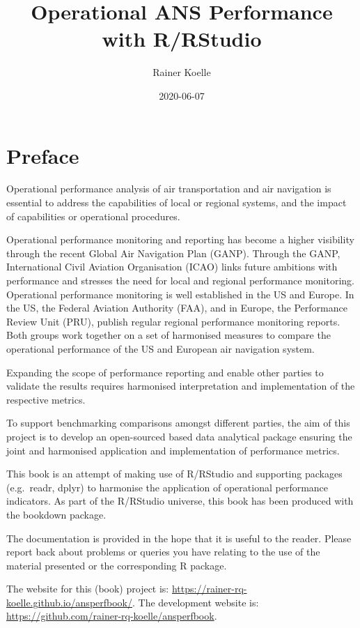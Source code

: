 \documentclass[
]{book}
\title{Operational ANS Performance with R/RStudio}
\author{Rainer Koelle}
\date{2020-06-07}
\begin{document}
\maketitle

{
\setcounter{tocdepth}{1}
\tableofcontents
}
\hypertarget{preface}{%
\chapter*{Preface}\label{preface}}

Operational performance analysis of air transportation and air navigation is essential to address the capabilities of local or regional systems, and the impact of capabilities or operational procedures.

Operational performance monitoring and reporting has become a higher visibility through the recent Global Air Navigation Plan (GANP). Through the GANP, International Civil Aviation Organisation (ICAO) links future ambitions with performance and stresses the need for local and regional performance monitoring.
Operational performance monitoring is well established in the US and Europe.
In the US, the Federal Aviation Authority (FAA), and in Europe, the Performance Review Unit (PRU), publish regular regional performance monitoring reports.
Both groups work together on a set of harmonised measures to compare the operational performance of the US and European air navigation system.

Expanding the scope of performance reporting and enable other parties to validate the results requires harmonised interpretation and implementation of the respective metrics.

To support benchmarking comparisons amongst different parties, the aim of this project is to develop an open-sourced based data analytical package ensuring the joint and harmonised application and implementation of performance metrics.

This book is an attempt of making use of R/RStudio and supporting packages (e.g.~readr, dplyr) to harmonise the application of operational performance indicators.
As part of the R/RStudio universe, this book has been produced with the bookdown package.

The documentation is provided in the hope that it is useful to the reader.
Please report back about problems or queries you have relating to the use of the material presented or the corresponding R package.

The website for this (book) project is: \url{https://rainer-rq-koelle.github.io/ansperfbook/}.
The development website is: \url{https://github.com/rainer-rq-koelle/ansperfbook}.
\end{document}
